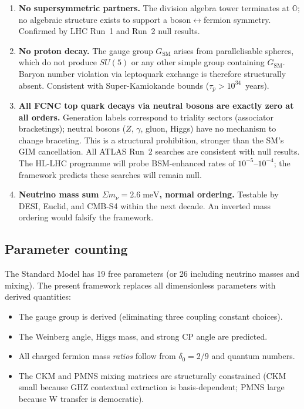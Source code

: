 \documentclass{article}
\begin{document}
\begin{enumerate}
  \item \textbf{No supersymmetric partners.} The division algebra tower terminates at $\mathbb{O}$; no algebraic structure exists to support a boson$\leftrightarrow$fermion symmetry. Confirmed by LHC Run~1 and Run~2 null results.

  \item \textbf{No proton decay.} The gauge group $G_{\mathrm{SM}}$ arises from parallelisable spheres, which do not produce $SU(5)$ or any other simple group containing $G_{\mathrm{SM}}$. Baryon number violation via leptoquark exchange is therefore structurally absent. Consistent with Super-Kamiokande bounds ($\tau_p > 10^{34}$~years).

  \item \textbf{All FCNC top quark decays via neutral bosons are exactly zero at all orders.} Generation labels correspond to triality sectors (associator bracketings); neutral bosons ($Z$, $\gamma$, gluon, Higgs) have no mechanism to change braceting. This is a structural prohibition, stronger than the SM's GIM cancellation. All ATLAS Run~2 searches are consistent with null results. The HL-LHC programme will probe BSM-enhanced rates of $10^{-5}$--$10^{-4}$; the framework predicts these searches will remain null.

  \item \textbf{Neutrino mass sum $\Sigma m_\nu = 2.6\;\mathrm{meV}$, normal ordering.} Testable by DESI, Euclid, and CMB-S4 within the next decade. An inverted mass ordering would falsify the framework.
\end{enumerate}

\subsection{Parameter counting}

The Standard Model has 19 free parameters (or 26 including neutrino masses and mixing). The present framework replaces all dimensionless parameters with derived quantities:

\begin{itemize}
  \item The gauge group is derived (eliminating three coupling constant choices).
  \item The Weinberg angle, Higgs mass, and strong CP angle are predicted.
  \item All charged fermion mass \emph{ratios} follow from $\delta_0 = 2/9$ and quantum numbers.
  \item The CKM and PMNS mixing matrices are structurally constrained (CKM small because GHZ contextual extraction is basis-dependent; PMNS large because W transfer is democratic).
\end{itemize}
\end{document}
